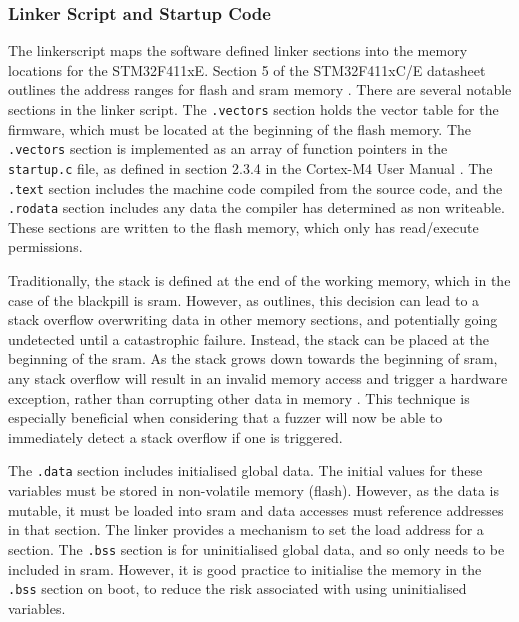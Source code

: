 \documentclass[../report.tex]{subfiles}
\begin{document}
\subsubsection{Linker Script and Startup Code} \label{sec:linkerscript}

The linkerscript maps the software defined linker sections into the memory
locations for the STM32F411xE. Section 5 of the STM32F411xC/E datasheet
outlines the address ranges for flash and sram memory
\citep{stm32f4_datasheet}. There are several notable sections in the linker
script. The \lstinline|.vectors| section holds the vector table for the
firmware, which must be located at the beginning of the flash memory. The
\lstinline|.vectors| section is implemented as an array of function pointers in
the \lstinline|startup.c| file, as defined in section 2.3.4 in the Cortex-M4
User Manual \citep{armcm4_manual}. The \lstinline|.text| section includes the
machine code compiled from the source code, and the \lstinline|.rodata| section
includes any data the compiler has determined as non writeable. These sections
are written to the flash memory, which only has read/execute permissions.

Traditionally, the stack is defined at the end of the working memory, which in
the case of the blackpill is sram. However, as \citet{miro_stack} outlines,
this decision can lead to a stack overflow overwriting data in other memory
sections, and potentially going undetected until a catastrophic failure.
Instead, the stack can be placed at the beginning of the sram. As the stack
grows down towards the beginning of sram, any stack overflow will result in an
invalid memory access and trigger a hardware exception, rather than corrupting
other data in memory \citep{miro_stack}. This technique is especially
beneficial when considering that a fuzzer will now be able to immediately
detect a stack overflow if one is triggered.

The \lstinline|.data| section includes initialised global data. The initial
values for these variables must be stored in non-volatile memory (flash).
However, as the data is mutable, it must be loaded into sram and data accesses
must reference addresses in that section. The linker provides a mechanism to
set the load address for a section. The \lstinline|.bss| section is for
uninitialised global data, and so only needs to be included in sram. However,
it is good practice to initialise the memory in the \lstinline|.bss| section on
boot, to reduce the risk associated with using uninitialised variables.
\end{document}
